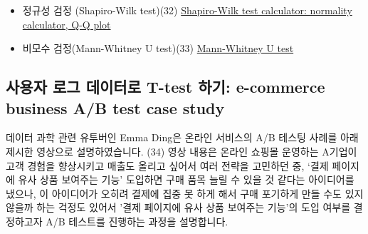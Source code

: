\documentclass[
  letterpaper,
]{book}
\begin{document}
\begin{itemize}
\item
  정규성 검정 (Shapiro-Wilk test)(32)
  \href{https://www.statskingdom.com/shapiro-wilk-test-calculator.html}{Shapiro-Wilk
  test calculator: normality calculator, Q-Q plot}
\item
  비모수 검정(Mann-Whitney U test)(33)
  \href{https://www.statskingdom.com/170median_mann_whitney.html}{Mann-Whitney
  U test}
\end{itemize}

\subsection{사용자 로그 데이터로 T-test 하기: e-commerce business A/B
test case
study}\label{uxc0acuxc6a9uxc790-uxb85cuxadf8-uxb370uxc774uxd130uxb85c-t-test-uxd558uxae30-e-commerce-business-ab-test-case-study}

데이터 과학 관련 유투버인 Emma Ding은 온라인 서비스의 A/B 테스팅 사례를
아래 제시한 영상으로 설명하였습니다. (34) 영상 내용은 온라인 쇼핑몰
운영하는 A기업이 고객 경험을 향상시키고 매출도 올리고 싶어서 여러 전략을
고민하던 중, `결제 페이지에 유사 상품 보여주는 기능' 도입하면 구매 품목
늘릴 수 있을 것 같다는 아이디어를 냈으나, 이 아이디어가 오히려 결제에
집중 못 하게 해서 구매 포기하게 만들 수도 있지 않을까 하는 걱정도 있어서
'결제 페이지에 유사 상품 보여주는 기능'의 도입 여부를 결정하고자 A/B
테스트를 진행하는 과정을 설명합니다.
\end{document}
